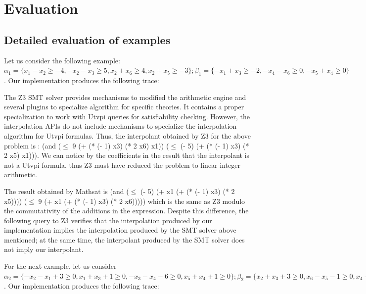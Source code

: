 \section{Evaluation}

\subsection{Detailed evaluation of examples}

Let us consider the following example:
$\alpha_1 = \{x_1 - x_2 \geq -4, -x_2 - x_3 \geq 5, 
  x_2 + x_6 \geq 4, x_2 + x_5 \geq -3\}; 
\beta_1 = \{-x_1 + x_3 \geq -2, -x_4 - x_6 \geq 0, -x_5 + x_4 \geq 0\}$. 
Our implementation produces the following trace:



The Z3 SMT solver provides mechanisms to modified the arithmetic engine 
and several plugins to specialize algorithm for specific theories. It contains a
proper specialization to work with Utvpi queries for satisfiability checking. However, 
       the interpolation APIs do not include mechanisms to specialize the 
       interpolation algorithm for Utvpi formulas. Thus, the interpolant obtained by Z3 
       for the above problem is : 
       (and ($\leq$ 9 (+ (* (- 1) x3) (* 2 x6) x1)) ($\leq$ (- 5) (+ (* (- 1) x3) (* 2 x5) x1))).
       We can notice by the coefficients in the result that the interpolant is not
       a Utvpi formula, thus Z3 must have reduced the problem to linear integer arithmetic.

  The result obtained by Mathsat is 
(and ($\leq$ (- 5) (+ x1 (+ (* (- 1) x3) (* 2 x5)))) ($\leq$ 9 (+ x1 (+ (* (- 1) x3) (* 2 x6))))) 
  which is the same as Z3 modulo the commutativity of the
  additions in the expression. Despite this difference, the following query 
  to Z3 verifies that the interpolation produced by our implementation implies 
  the interpolation produced by the SMT solver above mentioned; at the same time,
  the interpolant produced by the SMT solver does not imply our interpolant.

  

  For the next example, let us consider $\alpha_2 = \{
  -x_2 - x_1 + 3 \geq 0, 
  x_1 + x_3 + 1 \geq 0, 
  -x_3 - x_4 - 6 \geq 0, 
  x_5 + x_4 + 1 \geq 0 
  \}; \beta_2 = \{
  x_2 + x_3 + 3 \geq 0,
  x_6 - x_5 - 1 \geq 0,
  x_4 - x_6 + 4 \geq 0
  \}$. Our implementation produces the following trace:

